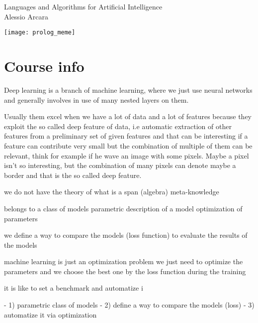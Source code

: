 \documentclass{article}
\author{Alessio Arcara}
\begin{document}
\begin{titlepage}
    \vspace*{\fill}
   \centering
   \Huge Languages and Algorithms for Artificial Intelligence\\
   \Large Alessio Arcara

   \mbox{}

   \begin{center}
       \texttt{[image: prolog\_meme]}
   \end{center}
    \vspace*{\fill}
\end{titlepage}

\tableofcontents
\clearpage

\parindent 0pt

\cleardoublepage
\section{Course info}
Deep learning is a branch of machine learning, where we just use neural
networks and generally involves in use of many nested layers on them.

Usually them excel when we have a lot of data and a lot of features because
they exploit the so called deep feature of data, i.e automatic extraction of
other features from a preliminary set of given features and that can be
interesting if a feature can contribute very small but the combination of
multiple of them can be relevant, think for example if he wave an image with
some pixels. Maybe a pixel isn't so interesting, but the combination of many
pixels can denote maybe a border and that is the so called deep feature.

we do not have the theory of what is a span (algebra)
meta-knowledge 

belongs to a class of models
parametric description of a model 
optimization of parameters

we define a way to compare the models (loss function) to evaluate the results
of the models 

machine learning is just an optimization problem 
we just need to optimize the parameters and we choose the best one by the loss
function during the training

it is like to set a benchmark and automatize i 

- 1) parametric class of models 
- 2) define a way to compare the models (loss)
- 3) automatize it via optimization
\end{document}
